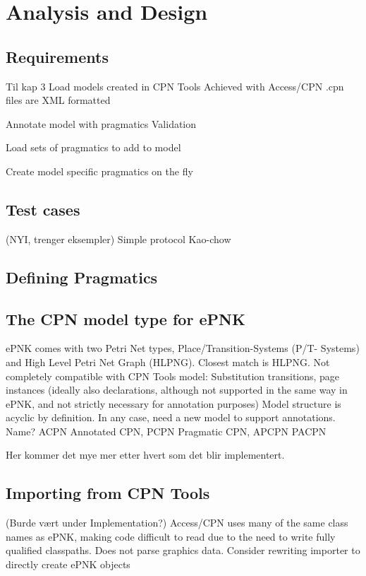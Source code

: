 \chapter{Analysis and Design}
\label{chap:analysis}

\section{Requirements} Til kap 3
Load models created in CPN Tools
	Achieved with Access/CPN
	.cpn files are XML formatted

Annotate model with pragmatics
	Validation

Load sets of pragmatics to add to model

Create model specific pragmatics on the fly

\section{Test cases}

(NYI, trenger eksempler)
Simple protocol
Kao-chow


\section{Defining Pragmatics}




\section{The CPN model type for ePNK}
ePNK comes with two Petri Net types, Place/Transition-Systems (P/T-
Systems) and High Level Petri Net Graph (HLPNG). Closest match is HLPNG.
Not completely compatible with CPN Tools model: Substitution transitions, page
instances (ideally also declarations, although not supported in the same way in
ePNK, and not strictly necessary for annotation purposes)
Model structure is acyclic by definition.
In any case, need a new model to support annotations. 
Name? ACPN Annotated CPN, PCPN Pragmatic CPN, APCPN PACPN

Her kommer det mye mer etter hvert som det blir implementert.

\section{Importing from CPN Tools}
(Burde vært under Implementation?)
Access/CPN uses many of the same class names as ePNK, making code difficult to
read due to the need to write fully qualified classpaths.
Does not parse graphics data.
Consider rewriting importer to directly create ePNK objects

